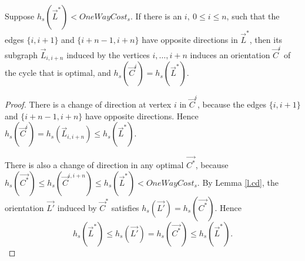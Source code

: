 \begin{lemma}\label{l.subo}
	Suppose $h_s(\vec{L}^*) < OneWayCost_s$.
	If there is an $i,\ 0\leq i \leq n$, such that the edges $\{i,i+1\}$ and $\{i+n-1,i+n\}$ 
	have opposite directions in $\vec{L}^*$,
	then its subgraph $\vec{L}_{i,i+n}$ induced by the vertices $i,\ldots,i+n$ induces
	an orientation $\vec{C}^{i}$ of the cycle that is optimal, and $h_s(\vec{C}^{i})= h_s(\vec{L}^*)$.
\end{lemma}
\begin{proof}
	
There is a change of direction at vertex $i$ in $\vec{C}^{i}$,
because the edges $\{i,i+1\}$ and $\{i+n-1,i+n\}$ have opposite directions.
Hence $h_s(\vec{C}^{i}) =h_s(\vec{L}_{i,i+n})\leq h_s(\vec{L}^*)$.

There is also a change of direction in any optimal $\vec{C^*}$, because 
$h_s(\vec{C^*}) \leq h_s(\vec{C}^{i, i+n})  \leq h_s(\vec{L}^*)<OneWayCost_s$. 
By Lemma \ref{l.cd},  the orientation $\vec{L'}$ induced by $\vec{C}^*$
satisfies $h_s(\vec{L'})= h_s(\vec{C^*})$. Hence
$$h_s(\vec{L}^*)\leq h_s(\vec{L'})= h_s(\vec{C^*})\leq h_s(\vec{L}^*) .$$
\end{proof}

